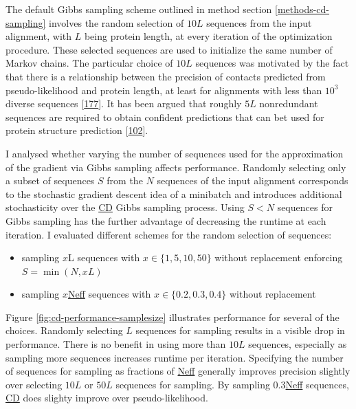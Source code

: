 \documentclass[11pt,a4paper,twoside]{book}
\providecommand{\tightlist}{%
  \setlength{\itemsep}{0pt}\setlength{\parskip}{0pt}}
\newcommand{\eq}{\!=\!}
\theoremstyle{definition}
\theoremstyle{definition}
\theoremstyle{remark}
\begin{document}
The default Gibbs sampling scheme outlined in method section
\ref{methods-cd-sampling} involves the random selection of \(10L\)
sequences from the input alignment, with \(L\) being protein length, at
every iteration of the optimization procedure. These selected sequences
are used to initialize the same number of Markov chains. The particular
choice of \(10L\) sequences was motivated by the fact that there is a
relationship between the precision of contacts predicted from
pseudo-likelihood and protein length, at least for alignments with less
than \(10^3\) diverse sequences
{[}\protect\hyperlink{ref-Anishchenko2017}{177}{]}. It has been argued
that roughly \(5L\) nonredundant sequences are required to obtain
confident predictions that can bet used for protein structure prediction
{[}\protect\hyperlink{ref-Kamisetty2013}{102}{]}.

I analysed whether varying the number of sequences used for the
approximation of the gradient via Gibbs sampling affects performance.
Randomly selecting only a subset of sequences \(S\) from the \(N\)
sequences of the input alignment corresponds to the stochastic gradient
descent idea of a minibatch and introduces additional stochasticity over
the \protect\hyperlink{abbrev}{CD} Gibbs sampling process. Using
\(S < N\) sequences for Gibbs sampling has the further advantage of
decreasing the runtime at each iteration. I evaluated different schemes
for the random selection of sequences:

\begin{itemize}
\tightlist
\item
  sampling \(x\)L sequences with \(x \in \{ 1, 5, 10, 50 \}\) without
  replacement enforcing \(S \eq \min(N, xL)\)
\item
  sampling \(x\)\protect\hyperlink{abbrev}{Neff} sequences with
  \(x \in \{ 0.2, 0.3, 0.4 \}\) without replacement
\end{itemize}

Figure \ref{fig:cd-performance-samplesize} illustrates performance for
several of the choices. Randomly selecting \(L\) sequences for sampling
results in a visible drop in performance. There is no benefit in using
more than \(10L\) sequences, especially as sampling more sequences
increases runtime per iteration. Specifying the number of sequences for
sampling as fractions of \protect\hyperlink{abbrev}{Neff} generally
improves precision slightly over selecting \(10L\) or \(50L\) sequences
for sampling. By sampling \(0.3\)\protect\hyperlink{abbrev}{Neff}
sequences, \protect\hyperlink{abbrev}{CD} does slighty improve over
pseudo-likelihood.
\end{document}
